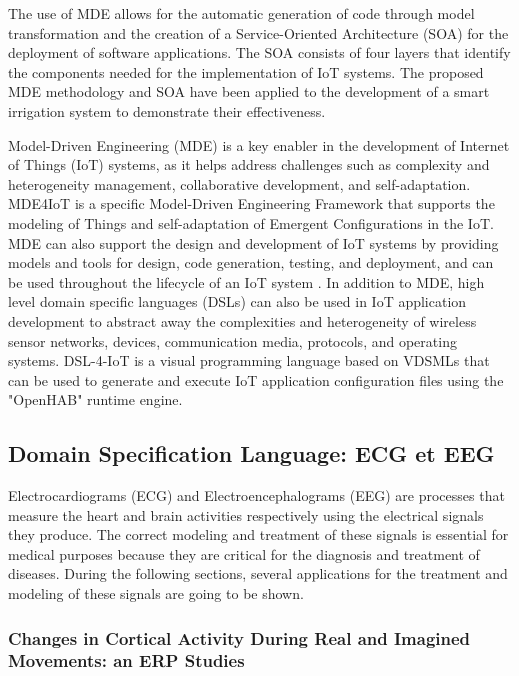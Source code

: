 The use of MDE allows for the automatic generation of code through model transformation and the creation of a Service-Oriented Architecture (SOA) for the deployment of software applications. The SOA consists of four layers that identify the components needed for the implementation of IoT systems. The proposed MDE methodology and SOA have been applied to the development of a smart irrigation system to demonstrate their effectiveness.


Model-Driven Engineering (MDE) is a key enabler in the development of Internet of Things (IoT) systems, as it helps address challenges such as complexity and heterogeneity management, collaborative development, and self-adaptation. MDE4IoT \cite{MDE4IOT} is a specific Model-Driven Engineering Framework that supports the modeling of Things and self-adaptation of Emergent Configurations in the IoT. MDE can also support the design and development of IoT systems by providing models and tools for design, code generation, testing, and deployment, and can be used throughout the lifecycle of an IoT system \cite{MDE4IOTApplicationPrototyping}. In addition to MDE, high level domain specific languages (DSLs) can also be used in IoT application development to abstract away the complexities and heterogeneity of wireless sensor networks, devices, communication media, protocols, and operating systems. DSL-4-IoT \cite{designDSLandIDEforIOTa} is a visual programming language based on VDSMLs that can be used to generate and execute IoT application configuration files using the "OpenHAB" runtime engine. 

\subsection{Domain Specification Language: ECG et EEG}

Electrocardiograms (ECG) and Electroencephalograms (EEG) are processes that measure the heart and brain activities respectively using the electrical signals they produce. The correct modeling and treatment of these signals is essential for medical purposes because they are critical for the diagnosis and treatment of diseases. During the following sections, several applications for the treatment and modeling of these signals are going to be shown.

\subsubsection{Changes in Cortical Activity During Real and Imagined Movements: an ERP Studies}

